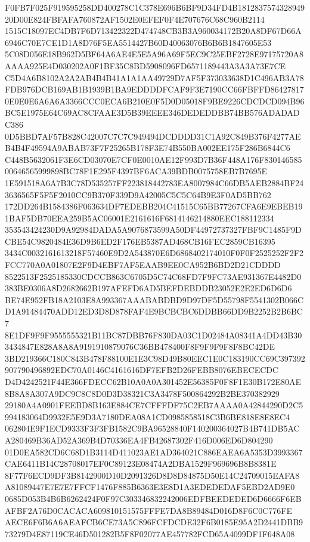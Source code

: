 \documentclass[UTF8,fontset=fandol,zihao=-4,a4paper]{ctexart}
\begin{document}
{{F0FB7F025F919595258DD400278C1C378E696B6BF9D34FD4B181283757432894920D00E824FBFAFA760872AF1502E0EFEF0F4E707676C68C960B2114
1515C18097EC4DB7F6D713422322D474748CB3B3A960034172B20A8DF67D66A6946C70E7CE1D1A8D76F5EA5514427B60D40063076B6B6B1847605E53
5C08D056E18B962D5BF64A6AE4E5E5A96A69F5EC9C25EBF2728E97175720A8AAAA925E4D030202A0F1BF35C8BD5908096FD6571189443A3A3A73E7CE
C5D4A6B8102A2A2AB4B4B41A1A1AA49729D7AF5F373033638D1C496AB3A78FDB976DCB169AB1B1939B1BA9EDDDDFCAF9F3E7190CC66FBFFD86427817
0E0E0E6A6A6A3366CCC0ECA6B210E0F5D0D05018F9BE9226CDCDCD094B96BC5E1975E64C69AC8CFAAE3D5B39EEEE346DEDEDDBB74BB576ADADADC386
0D5BBD7AF57B828C42007C7C7C949494DCDDDD31C1A92C849B376F4277AEB4B4F49594A9ABAB73F7F25265B178F3E74B550BA002EE175F286B6844C6
C448B5632061F3E6CD03070E7CF0E0010AE12F993D7B36F448A176F83014658500646565999898BC78F1E295F4397BF6ACA39BDB0075758EB7B7695E
1E591518A6A7B3C78D535257FF223818442783EA8007984C66DB5AEB2884BF243636565F5F5F2010CC9B370F339D9A42005C5C5C64B9E3F0AD5BB762
172DD264B1584386F063634DF7EDEBB204C41515C65BB77267CFA6E9EBEB191BAF5DB70EEA259B5AC06001E2161616F6814146214880EEC188112334
353543424230D9A92984DADA5A9076873599A50DF44972737327FBF9C1485F9DCBE54C9820484E36D9B6ED2F176EB5387AD468CB16FEC2859CB16395
3434C0032161613218F57460E9D2A543870E6D6868402174010F0F0F2525252F2F2FCC770A0A01807E2F9D4EBF7AF5EAAB9EE0CA952B6BD2D21CDDDD
8522513F2525185330CDCCB863C6705D5C74C68FD7F9FC73AE931367E4482D0383BE0306A8D2682662B197AFEFD6AD5BEFDEBDDB23052E2E2ED6D6D6
BE74E952FB18A2103E8A993367AAABABDBD9D97DF5D55798F5541302B066CD1A91484470ADD12ED3D8D878FAF4E9BCBCBC6DDBB66DD9B2252B2B6BC7
8E1DF9F9F9555555321B11BC87DBB76F830DA03C1D02484A08341A4DD43B303434847E828A8A8A9191910879076C36BB478400F8F9F9F9F8F8BC42DE
3BD219366C180C843B478F88100E1E3C98D49B80EEC1E0C183190CC69C397392907790496892EDC70A0146C4161616DF7EFB2D26FEBB8076EBECECDC
D4D4242521F44E366FDECC62B10A0A0A301452E56385F0F8F1E30B172E80AE8B8A8A307A9DC9C8C8D0D3D38321C3A3478F500864292B2BE370382929
29180A4A0901FEEBD8B163E884CE7CFFFDF75C2EB7AAAA0A42844290D2C5994183064D9932E5E9D3A7180DEA08A1CD0985858518C3B6BE818E8E8EC4
062804E9F1ECD9333F3F3FB1582C9BA96528840F140200364027B4B741DB5ACA280469B36AD52A369B4D70336EA4FB42687302F416D006ED6D804290
01D0EA582CD6C68D1B3114D411023AE1AD364021C886EAEA6A5353D3993367CAE6411B14C28708017EF0C89123E08474A2DBA1529F969696B8B8381E
8F77F6ECD9DF3B8142900D10D2091326D8D8D84875D50E14C24709015EAFA8A81089447E7E7E7FFCF1476F885B6363E3E8D1A3EDEDEDAF5EBD2AD9E0
0685D053B4B6B6262424F0F97C303346832242006EDFBEEDEDED6D6666F6EBAFBF2A76D0CACACA609810151575FFFE7DA8B89484D016D8F6C0C776FE
AECE6F6B6A6AEAFCB6CE73A5C896FCFDCDE32F6B0185E95A2D2441DBB973279D4E87119CE46D501282B5F8F02077AE457782FCD65A4099DF1F648A08
}}
\end{document}

